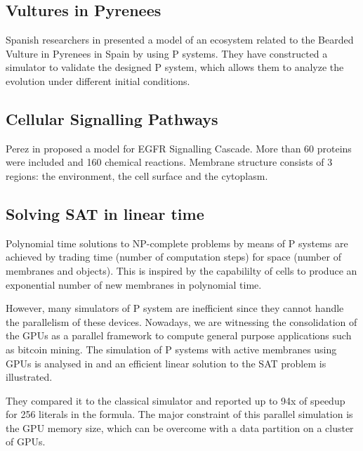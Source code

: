 \subsection{Vultures in Pyrenees} %
\label{sub:vultures_in_pyrenees}

Spanish researchers in \cite{Cardona:2009:Vultures} presented a model of an ecosystem related to the Bearded Vulture in Pyrenees in Spain by using P systems. They have constructed a simulator to validate the designed P system, which allows them to analyze the evolution under different initial conditions.


\subsection{Cellular Signalling Pathways} %
\label{sub:cellular_signalling_pathways}

Perez in \cite{Perez06EGFR} proposed a model for EGFR Signalling Cascade. More than 60 proteins were included and 160 chemical reactions. Membrane structure consists of 3 regions: the environment, the cell surface and the cytoplasm. 


\subsection{Solving SAT in linear time} %
\label{sub:solving_sat_in_linear_time}


Polynomial time solutions to NP-complete problems by means of P systems are achieved by trading time (number of computation steps) for space (number of membranes and objects). This is inspired by the capabililty of cells to produce an exponential number of new membranes in polynomial time.

However, many simulators of P system are inefficient since they cannot handle the parallelism of these devices. Nowadays, we are witnessing the consolidation of the GPUs as a parallel framework to compute general purpose applications such as bitcoin mining. The simulation of P systems with active membranes using GPUs is analysed in \cite{Cecilia10SAT} and an efficient linear solution to the SAT problem is illustrated.

They compared it to the classical simulator and reported up to 94x of speedup for 256 literals in the formula. The major constraint of this parallel simulation is the GPU memory size, which can be overcome with a data partition on a cluster of GPUs. 


